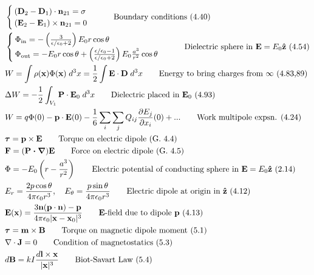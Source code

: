 \documentclass[10pt]{article}
\newcommand{\zhat}{\boldsymbol{\hat{\textbf{z}}}}
\newcommand{\ve}[1]{\boldsymbol{\mathbf{#1}}}
\newcommand{\vect}[1]{\boldsymbol{\mathbf{#1}}}
\newcommand{\eo}{\epsilon_0}
\newcommand{\pder}[2]{\frac{\partial #1}{\partial #2}}
\begin{document}
\begin{multicols}{2}
\begin{align*}
		& \begin{cases}
			(\vect{D}_2 - \vect{D}_1) \cdot \vect{n}_{21} = \sigma \\
			(\vect{E}_2 - \vect{E}_1) \times \vect{n}_{21} = 0 \\
		\end{cases}	\tag*{Boundary conditions (4.40)} \\
		&\begin{cases}
			\Phi_{\text{in}} = - \left( \frac{3}{\epsilon/\eo + 2} \right) E_0 r \cos \theta \\ 
			\Phi_{\text{out}} = - E_0 r \cos \theta + \left( \frac{\epsilon/\eo - 1}{\epsilon/\eo + 2} \right) E_0 \frac{a^3}{r^2} \cos \theta 
		\end{cases} \tag*{Dielectric sphere in $\vect{E} = E_0 \zhat$ (4.54)} \\
		& W = \int \rho(\vect{x}) \Phi(\vect{x})\; d^3x = \frac{1}{2} \int \vect{E} \cdot \vect{D} \; d^3x \tag*{Energy to bring charges from $\infty$ (4.83,89)} \\	
		& \Delta W = - \frac{1}{2} \int_{V_1} \vect{P} \cdot \vect{E}_0 \; d^3 x \tag*{Dielectric placed in $\vect{E}_0$ (4.93)} \\
		& W = q \Phi(0) - \vect{p} \cdot \vect{E}(0) - \frac{1}{6} \sum_i \sum_j Q_{ij} \pder{E_j}{x_i}(0) + ... \tag*{Work multipole expsn. (4.24)} \\
		&\ve{\tau} = \ve{p} \times \ve{E} \tag*{Torque on electric dipole (G. 4.4)} \\
		& \ve{F} = (\ve{P \cdot \nabla}) \ve{E} \tag*{Force on electric dipole (G. 4.5)} \\
		& \Phi = -E_0 \left( r - \frac{a^3}{r^2} \right)	\tag*{Electric potential of conducting sphere in $\vect{E} = E_0 \zhat$ (2.14)} \\
		& E_r=\frac{2 p \cos \theta}{4 \pi \eo r^3}, \quad E_\theta=\frac{p \sin \theta}{4 \pi \eo r^3} \tag*{Electric dipole at origin in $\zhat$ (4.12)} \\
		& \vect{E}(\vect{x}) = \frac{3 \vect{n}(\vect{p} \cdot \vect{n}) - \vect{p}}{4 \pi \eo |\vect{x} - \vect{x}_0|^3} \tag*{$\vect{E}$-field due to dipole $\vect{p}$ (4.13)} \\
		& \vect{\tau} = \vect{m} \times \vect{B} \tag*{Torque on magnetic dipole moment (5.1)} \\
		& \nabla \cdot \vect{J} = 0 \tag*{Condition of magnetostatics (5.3)} \\
		& d \vect{B} = k I \frac{d \vect{l} \times \vect{x}}{|\vect{x}|^3} \tag*{Biot-Savart Law (5.4)} \\

\end{align*}
\end{multicols}
\end{document}
